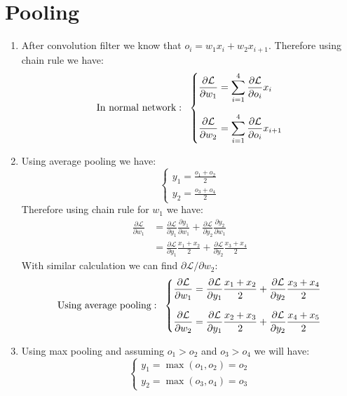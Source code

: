 \documentclass[12]{article}
\newcommand{\myskip}{0.7em}
\begin{document}
	\section{Pooling}
	\begin{enumerate}[label=\textbf{(\alph*)}]
		\item
		After convolution filter we know that $o_i = w_1 x_i + w_2 x_{i+1}$. Therefore using chain rule we have:
		\[
		\text{In normal network}:\;\;\begin{dcases}
			\frac{\partial \mathcal{L}}{\partial w_1} = \sum_{i=1}^4 \frac{\partial \mathcal{L}}{\partial o_i} x_i \\[\myskip]
			\frac{\partial \mathcal{L}}{\partial w_2} = \sum_{i=1}^4 \frac{\partial \mathcal{L}}{\partial o_i} x_{i+1}
		\end{dcases}
		\]
		\item
		Using average pooling we have:
		\[
		\begin{cases}
			y_1 = \frac{o_1 + o_2}{2} \\
			y_2 = \frac{o_3 + o_4}{2}
		\end{cases}
		\]
		Therefore using chain rule for $w_1$ we have:
		\[
		\begin{aligned}
			\frac{\partial \mathcal{L}}{\partial w_1} &= \frac{\partial \mathcal{L}}{\partial y_1}\frac{\partial y_1}{\partial w_1} + \frac{\partial \mathcal{L}}{\partial y_2} \frac{\partial y_2}{\partial w_1} \\[\myskip]
			&= \frac{\partial \mathcal{L}}{\partial y_1}\frac{x_1+x_2}{2} + \frac{\partial \mathcal{L}}{\partial y_2}\frac{x_3+x_4}{2}
		\end{aligned}
		\]
		With similar calculation we can find $\partial \mathcal{L}/\partial w_2$:
		\[
		\text{Using average pooling}:\;\;\begin{dcases}
			\frac{\partial \mathcal{L}}{\partial w_1} = \frac{\partial \mathcal{L}}{\partial y_1}\frac{x_1+x_2}{2} + \frac{\partial \mathcal{L}}{\partial y_2}\frac{x_3+x_4}{2} \\[\myskip]
			\frac{\partial \mathcal{L}}{\partial w_2} = \frac{\partial \mathcal{L}}{\partial y_1}\frac{x_2+x_3}{2} + \frac{\partial \mathcal{L}}{\partial y_2}\frac{x_4+x_5}{2}
		\end{dcases}
		\]
		\item
		Using max pooling and assuming $o_1 > o_2$ and $o_3 > o_4$ we will have:
		\[
		\begin{cases}
			y_1 = \max(o_1, o_2) = o_2 \\
			y_2 = \max(o_3, o_4) = o_3
		\end{cases}
\]
\end{enumerate}
\end{document}
